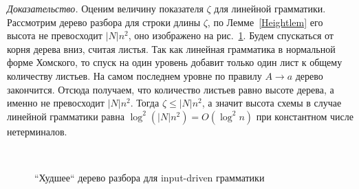 \documentclass{spbau-diploma}
\begin{document}
\textit{Доказательство.} Оценим величину показателя $\zeta$ для линейной грамматики. Рассмотрим дерево разбора для строки длины $\zeta$, по Лемме~\ref{Heightlem} его высота не превосходит $|N|n^2$, оно изображено на рис.~\ref{Linw}. Будем спускаться от корня дерева вниз, считая листья. Так как линейная грамматика в нормальной форме Хомского, то спуск на один уровень добавит только один лист к общему количеству листьев. На самом последнем уровне по правилу $A \rightarrow a$ дерево закончится. Отсюда получаем, что количество листьев равно высоте дерева, а именно не превосходит $|N|n^2$. Тогда  $\zeta \le |N|n^2$, а значит высота схемы в случае линейной грамматики равна $\log^2(|N|n^2) = O(\log^2 n)$ при константном числе нетерминалов. 

\begin{figure}
\centering

 \\
	\caption{``Худшее`` дерево разбора для input-driven грамматики}
\label{Linw}
\end{figure}
\end{document}
